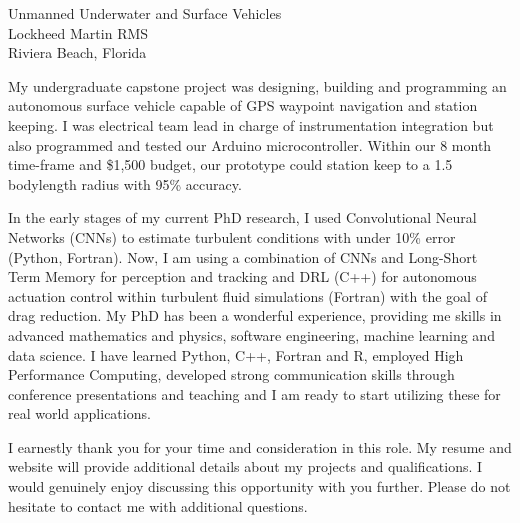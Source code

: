 \documentclass[11pt]{letter} %
\begin{document}
\begin{letter}{Unmanned Underwater and Surface Vehicles \\
Lockheed Martin RMS \\
Riviera Beach, Florida
}

My undergraduate capstone project was designing, building and programming an autonomous surface vehicle capable of GPS waypoint navigation and station keeping. I was electrical team lead in charge of instrumentation integration but also programmed and tested our Arduino microcontroller. Within our 8 month time-frame and \$1,500 budget, our prototype could station keep to a 1.5 bodylength radius with 95\% accuracy. 

In the early stages of my current PhD research, I used Convolutional Neural Networks (CNNs) to estimate turbulent conditions with under 10\% error (Python, Fortran). Now, I am using a combination of CNNs and Long-Short Term Memory for perception and tracking and DRL (C++) for autonomous actuation control within turbulent fluid simulations (Fortran) with the goal of drag reduction. My PhD has been a wonderful experience, providing me skills in advanced mathematics and physics, software engineering, machine learning and data science. I have learned Python, C++, Fortran and R, employed High Performance Computing, developed strong communication skills through conference presentations and teaching and I am ready to start utilizing these for real world applications. 
 

I earnestly thank you for your time and consideration in this role. My resume and website will provide additional details about my projects and qualifications. I would genuinely enjoy discussing this opportunity with you further. Please do not hesitate to contact me with additional questions.


\end{letter}
\end{document}
